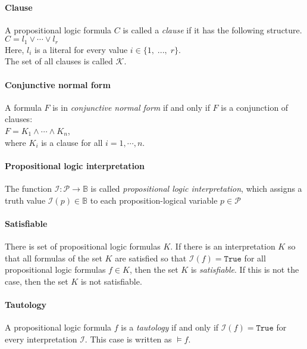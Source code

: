 \paragraph{Clause}
A propositional logic formula $C$ is called a \emph{clause} if it has the following structure.
\\[0.2cm]
\hspace*{1.3cm} $C = l_1 \vee \cdots \vee l_r$ \\[0.2cm] Here, $l_i$ is a literal for every value $i \in \{1,\; ...,\; r\}$.
\\[0.2cm]
The set of all clauses is called $\mathcal{K}$.

\paragraph{Conjunctive normal form} A formula $F$ is in \emph{conjunctive normal form} if and only if $F$ is a conjunction of clauses:
\\[0.2cm]
\hspace*{1.3cm} $F = K_1 \land \cdots \land K_n$, \\[0.2cm]
where $K_i$ is a clause for all $i = 1, \cdots, n$.

\paragraph{Propositional logic interpretation}
The function $\mathcal{I} : \mathcal{P} \rightarrow \mathbb{B}$ is called \emph{propositional logic interpretation}, which assigns a truth value $\mathcal{I}(p) \in \mathbb{B}$ to each proposition-logical variable $p\in \mathcal{P}$

\paragraph{Satisfiable}
There is set of propositional logic formulas $K$. If there is an interpretation $K$ so that all formulas of the set $K$ are satisfied so that $\mathcal{I}(f) = \texttt{True}$ for all propositional logic formulas $f \in K$, then the set $K$ is \emph{satisfiable}. If this is not the case, then the set $K$ is not satisfiable.

\paragraph{Tautology}
A propositional logic formula $f$ is a \emph{tautology} if and only if $\mathcal{I}(f) = \texttt{True}$ for every interpretation $\mathcal{I}$. This case is written as $\models f$.

